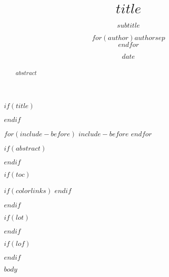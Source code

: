 \documentclass[doctor,twoside,chapterhead,otf]{znufethesis}
\title{\LARGE\textbf{$title$}}
\title{}
\subtitle{$subtitle$}
\author{$for(author)$$author$$sep$ \\ $endfor$}
\author{}
\date{$date$}
\date{}
\begin{document}
$if(title)$
\maketitle
$endif$
\blankpage


$for(include-before)$
$include-before$
$endfor$

\cleardoublepage
{} %

\blankpage

\cleardoublepage
\frontmatter
\pagestyle{plain}

\cleardoublepage
{} %
\ifodd\thepage
\blankpage
\fi

\cleardoublepage
\frontmatter

\ifodd\therealpage
\blankpage
\fi

$if(abstract)$
\begin{abstract}
$abstract$
\end{abstract}
$endif$

$if(toc)$
{
$if(colorlinks)$
\hypersetup{linkcolor=$if(toccolor)$$toccolor$$else$black$endif$}
$endif$

\setcounter{tocdepth}{$toc-depth$}
\cleardoublepage
{} %
\tableofcontents        %

\ifodd\thepage
\blankpage
\fi
}
$endif$

$if(lot)$
\cleardoublepage
{} %
\listoftables           %

\ifodd\thepage
\blankpage
\fi
$endif$

$if(lof)$
\cleardoublepage
{} %
\listoffigures          %

\ifodd\thepage
\blankpage
\fi
$endif$

\mainmatter
\pagestyle{mpage}

$body$

\ifodd\thepage
\blankpage
\fi

\cleardoublepage
\pagestyle{emptypage}
\renewcommand{\chapterlabel}{\bibname}

\end{document}
